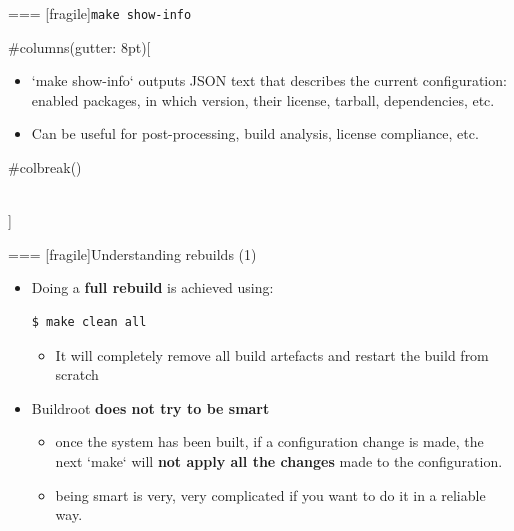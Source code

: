 === [fragile]{{\tt make show-info}}
  
#columns(gutter: 8pt)[
    \begin{itemize}
    \item `make show-info` outputs JSON text that describes the
      current configuration: enabled packages, in which version, their
      license, tarball, dependencies, etc.
    \item Can be useful for post-processing, build analysis, license
      compliance, etc.
    \end{itemize}

     #colbreak()
  \\]


=== [fragile]{Understanding rebuilds (1)}
  \begin{itemize}
  \item Doing a {\bf full rebuild} is achieved using:
    \begin{block}{}
\begin{verbatim}
$ make clean all
\end{verbatim}
\end{block}
\begin{itemize}
\item It will completely remove all build artefacts and restart the
  build from scratch
\end{itemize}
  \item Buildroot {\bf does not try to be smart}
    \begin{itemize}
    \item once the system has been built, if a configuration change is
      made, the next `make` will {\bf not apply all the changes}
      made to the configuration.
    \item being smart is very, very complicated if you want to do it
      in a reliable way.
    \end{itemize}
  \end{itemize}



